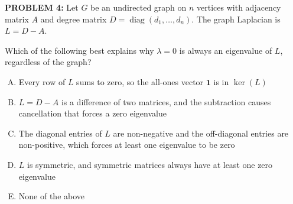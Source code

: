 \documentclass[12pt]{amsart}
\begin{document}
%
%
%
%
%


\newpage


{\bf PROBLEM 4:}
%
Let $G$ be an undirected graph on $n$ vertices with adjacency matrix $A$ 
and degree matrix $D = \operatorname{diag}(d_1, \ldots, d_n)$. The graph 
Laplacian is $L = D - A$.

Which of the following best explains why $\lambda = 0$ is always an 
eigenvalue of $L$, regardless of the graph?

\begin{enumerate}[(A)]
\item Every row of $L$ sums to zero, so the all-ones 
      vector $\mathbf{1}$ is in $\ker(L)$
\item $L = D - A$ is a difference of two matrices, and the subtraction 
      causes cancellation that forces a zero eigenvalue
\item The diagonal entries of $L$ are non-negative and the off-diagonal 
      entries are non-positive, which forces at least one eigenvalue 
      to be zero
\item $L$ is symmetric, and symmetric matrices always have at least one zero eigenvalue
\item None of the above
\end{enumerate}
\end{document}
